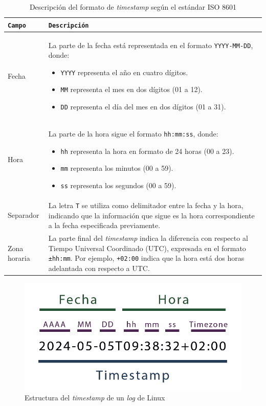 \begin{table}[H]
\centering
\footnotesize
\begin{tabularx}{\textwidth}{|>{\raggedright\arraybackslash}p{3cm}|>{\raggedright\arraybackslash}X|}
\hline
\rowcolor{graylight}\texttt{Campo} & \texttt{Descripción} \\
\hline
Fecha & La parte de la fecha está representada en el formato \texttt{YYYY-MM-DD}, donde:
\begin{itemize}
    \item \texttt{YYYY} representa el año en cuatro dígitos.
    \item \texttt{MM} representa el mes en dos dígitos (01 a 12).
    \item \texttt{DD} representa el día del mes en dos dígitos (01 a 31).
\end{itemize} \\
\hline
Hora & La parte de la hora sigue el formato \texttt{hh:mm:ss}, donde:
\begin{itemize}
    \item \texttt{hh} representa la hora en formato de 24 horas (00 a 23).
    \item \texttt{mm} representa los minutos (00 a 59).
    \item \texttt{ss} representa los segundos (00 a 59).
\end{itemize} \\
\hline
Separador & La letra \texttt{T} se utiliza como delimitador entre la fecha y la hora, indicando que la información que sigue es la hora correspondiente a la fecha especificada previamente. \\
\hline
Zona horaria & La parte final del \textit{timestamp} indica la diferencia con respecto al Tiempo Universal Coordinado (\gls{UTC}), expresada en el formato \texttt{±hh:mm}. Por ejemplo, \texttt{+02:00} indica que la hora está dos horas adelantada con respecto a \gls{UTC}. \\
\hline
\end{tabularx}
\caption{Descripción del formato de \textit{timestamp} según el estándar ISO 8601 \cite{iso8601}}
\label{tab:timestamp-format}
\end{table}

\begin{figure}[H]
    \centering
    \includegraphics[width=0.6\linewidth]{imagenes/linux-log-structure-timestamp.png}
    \caption{Estructura del \textit{timestamp} de un \textit{log} de Linux}
    \label{fig:linux-log-structure-timestamp}
\end{figure}

